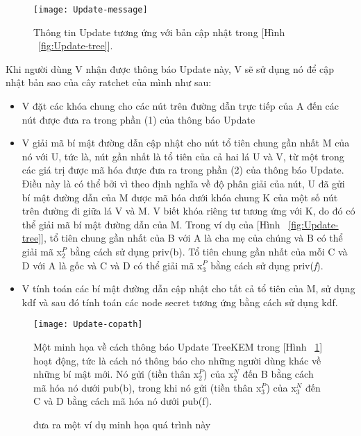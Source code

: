 \documentclass[../main-report.tex]{subfiles}
\begin{document}
\begin{figure}[!h]
\begin{center}
\label{fig:Update-message}
\texttt{[image: Update-message]}
\caption{Thông tin \gls{Update} tương ứng với bản cập nhật trong [Hình ~\ref{fig:Update-tree}].}
\end{center}
\end{figure}

Khi người dùng V nhận được thông báo \gls{Update} này, V sẽ sử dụng nó để cập nhật bản sao của cây ratchet của mình như sau:

\begin{itemize}
	\item{V đặt các khóa chung cho các nút trên đường dẫn trực tiếp của A  đến các nút được đưa ra trong phần (1) của thông báo \gls{Update}}
	\item{V giải mã bí mật đường dẫn cập nhật cho nút tổ tiên chung gần nhất M của nó với U, tức là, nút gần nhất là tổ tiên của cả hai lá U và V, từ một trong các giá trị được mã hóa được đưa ra trong phần (2) của thông báo \gls{Update}. Điều này là có thể bởi vì theo định nghĩa về độ phân giải của nút, U đã gửi bí mật đường dẫn của M được mã hóa dưới khóa chung K của một số nút trên đường đi giữa lá V và M. V biết khóa riêng tư tương ứng với K, do đó có thể giải mã bí mật đường dẫn của M. Trong ví dụ của [Hình ~\ref{fig:Update-tree}], tổ tiên chung gần nhất của B với A là cha mẹ của chúng và B có thể giải mã x$_{2}^{P}$ bằng cách sử dụng priv(b). Tổ tiên chung gần nhất của mỗi C và D với A là gốc và C và D có thể giải mã x$_{3}^{P}$ bằng cách sử dụng priv(\textit{f}).}
	\item{V tính toán các bí mật đường dẫn cập nhật cho tất cả tổ tiên của M, sử dụng \acrshort{kdf} và sau đó tính toán các node secret tương ứng bằng cách sử dụng \acrshort{kdf}.}
\end{itemize}

\begin{figure}[!h]
\begin{center}
\label{fig:Update-copath}
\caption{đưa ra một ví dụ minh họa quá trình này}
\texttt{[image: Update-copath]}

{Một minh họa về cách thông báo \gls{Update} TreeKEM trong [Hình ~\ref{fig:Update-message}] hoạt động, tức là cách nó thông báo cho những người dùng khác về những bí mật mới. Nó gửi (tiền thân x$_{2}^{P}$) của x$_{2}^{N}$ đến B bằng cách mã hóa nó dưới pub(b), trong khi nó gửi (tiền thân x$_{3}^{P}$) của x$_{3}^{N}$ đến C và D bằng cách mã hóa nó dưới pub(f).}
\end{center}
\end{figure}
\end{document}
